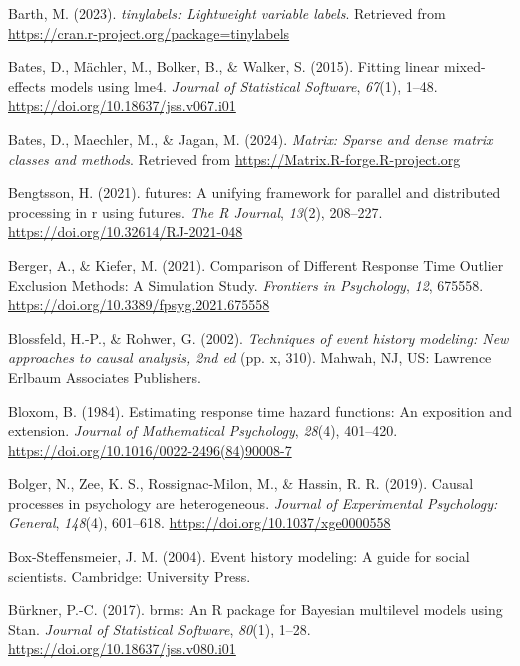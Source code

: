 \documentclass[
  english,
  man, donotrepeattitle,floatsintext]{apa6}
\newlength{\cslhangindent}
\newenvironment{CSLReferences}[2] %
 {\begin{list}{}{%
  \setlength{\itemindent}{0pt}
  \setlength{\leftmargin}{0pt}
  \setlength{\parsep}{0pt}
  \ifodd #1
   \setlength{\leftmargin}{\cslhangindent}
   \setlength{\itemindent}{-1\cslhangindent}
  \fi
  \setlength{\itemsep}{#2\baselineskip}}}
 {\end{list}}
\begin{document}
\begin{CSLReferences}{1}{0}
Barth, M. (2023). \emph{{tinylabels}: Lightweight variable labels}. Retrieved from \url{https://cran.r-project.org/package=tinylabels}

Bates, D., Mächler, M., Bolker, B., \& Walker, S. (2015). Fitting linear mixed-effects models using {lme4}. \emph{Journal of Statistical Software}, \emph{67}(1), 1--48. \url{https://doi.org/10.18637/jss.v067.i01}

Bates, D., Maechler, M., \& Jagan, M. (2024). \emph{Matrix: Sparse and dense matrix classes and methods}. Retrieved from \url{https://Matrix.R-forge.R-project.org}

Bengtsson, H. (2021). {futures}: A unifying framework for parallel and distributed processing in r using futures. \emph{The R Journal}, \emph{13}(2), 208--227. \url{https://doi.org/10.32614/RJ-2021-048}

Berger, A., \& Kiefer, M. (2021). Comparison of {Different Response Time Outlier Exclusion Methods}: {A Simulation Study}. \emph{Frontiers in Psychology}, \emph{12}, 675558. \url{https://doi.org/10.3389/fpsyg.2021.675558}

Blossfeld, H.-P., \& Rohwer, G. (2002). \emph{Techniques of event history modeling: {New} approaches to causal analysis, 2nd ed} (pp. x, 310). Mahwah, NJ, US: Lawrence Erlbaum Associates Publishers.

Bloxom, B. (1984). Estimating response time hazard functions: {An} exposition and extension. \emph{Journal of Mathematical Psychology}, \emph{28}(4), 401--420. \url{https://doi.org/10.1016/0022-2496(84)90008-7}

Bolger, N., Zee, K. S., Rossignac-Milon, M., \& Hassin, R. R. (2019). Causal processes in psychology are heterogeneous. \emph{Journal of Experimental Psychology: General}, \emph{148}(4), 601--618. \url{https://doi.org/10.1037/xge0000558}

Box-Steffensmeier, J. M. (2004). Event history modeling: A guide for social scientists. Cambridge: University Press.

Bürkner, P.-C. (2017). {brms}: An {R} package for {Bayesian} multilevel models using {Stan}. \emph{Journal of Statistical Software}, \emph{80}(1), 1--28. \url{https://doi.org/10.18637/jss.v080.i01}


\end{CSLReferences}
\end{document}
